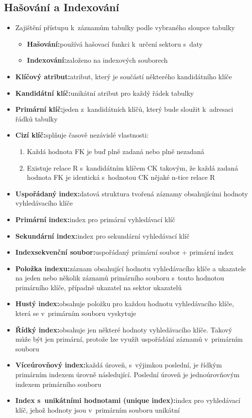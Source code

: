 \documentclass[a4paper,10pt]{article}
\newcommand{\pojem}[2]{\item \textbf{#1:}\quad #2}
\begin{document}
    \subsection{Hašování a Indexování}
      \begin{itemize}
        \item Zajištění přístupu k~záznamům tabulky podle vybraného sloupce tabulky
        \begin{itemize}
          \pojem{Hašování}{používá hašovací funkci k~určení sektoru s~daty}
          \pojem{Indexování}{založeno na indexových souborech}
        \end{itemize}

        \pojem{Klíčový atribut}{atribut, který je součástí některého kandidátního klíče}
        \pojem{Kandidátní klíč}{unikátní atribut pro každý řádek tabulky}
        \pojem{Primární klíč}{jeden z~kandidátních klíčů, který bude sloužit k~adresaci řádků tabulky}
        \pojem{Cizí klíč}{splňuje časově nezávislé vlastnosti:}
        \begin{enumerate}
          \item Každá hodnota FK je buď plně zadaná nebo plně nezadaná
          \item Existuje relace R s~kandidátním klíčem CK takovým, že každá zadaná hodnota FK je identická s~hodnotou CK nějaké n-tice relace R
        \end{enumerate}

        \pojem{Uspořádaný index}{datová struktura tvořená záznamy obsahujícími hodnoty vyhledávacího klíče}

        \pojem{Primární index}{index pro primární vyhledávací klíč}

        \pojem{Sekundární index}{index pro sekundární vyhledávací klíč}

        \pojem{Indexsekvenční soubor}{uspořádaný primární soubor + primární index}

        \pojem{Položka indexu}{záznam obsahující hodnotu vyhledávacího klíče a ukazatele na jeden nebo několik záznamů primárního souboru s~touto hodnotou primárního klíče, případně ukazatel na sektor ukazatelů}

        \pojem{Hustý index}{obsahuje položku pro každou hodnotu vyhledávacího klíče, která se v~primárním souboru vyskytuje}

        \pojem{Řídký index}{obsahuje jen některé hodnoty vyhledávacího klíče. Takový může být jen primární, protože lze využít uspořádání záznamů v~primárním souboru}

        \pojem{Víceúrovňový index}{každá úroveň, s~výjimkou poslední, je řídkým primárním indexem úrovně následující. Poslední úroveň je jednoúrovňovým indexem primárního souboru}

        \pojem{Index s~unikátními hodnotami (unique index)}{index pro vyhledávací klíč, jehož hodnoty jsou v~primárním souboru unikátní}
      \end{itemize}
\end{document}
